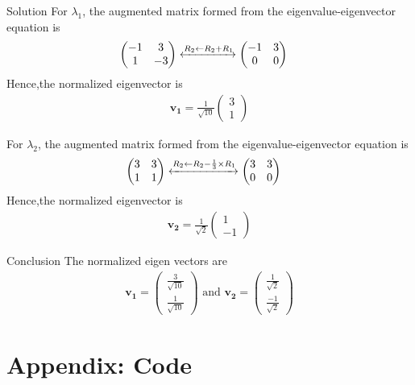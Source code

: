 \documentclass{beamer}
\numberwithin{equation}{section}
\theoremstyle{remark}
\newcommand{\myvec}[1]{\ensuremath{\begin{pmatrix}#1\end{pmatrix}}}
\let\vec\mathbf
\begin{document}
\begin{frame}{Solution}
For $\lambda_1$, the augmented matrix formed from the eigenvalue-eigenvector equation is 
\begin{align}
    \begin{pmatrix}
        -1 & 3\\
        1 & -3
    \end{pmatrix}  &\xleftrightarrow{R_2 \leftarrow R_2 + R_1} \begin{pmatrix}
        -1 & 3\\
        0 & 0
    \end{pmatrix}
\end{align}
Hence,the normalized eigenvector is
\begin{align}
    \vec{v_1}=\frac{1}{\sqrt{10}}\myvec{3\\1}
\end{align}

For $\lambda_2$, the augmented matrix formed from the eigenvalue-eigenvector equation is 
\begin{align}
    \begin{pmatrix}
        3 & 3\\
        1 & 1
    \end{pmatrix}  &\xleftrightarrow{R_2 \leftarrow R_2 - \frac{1}{3} \times R_1} \begin{pmatrix}
        3 & 3\\
        0 & 0
    \end{pmatrix}
\end{align}
Hence,the normalized eigenvector is
\begin{align}
    \vec{v_2}=\frac{1}{\sqrt{2}}\myvec{1\\-1}
\end{align}
\end{frame}

\begin{frame}{Conclusion}
The normalized eigen vectors are 
\begin{align}
    \vec{v_1}=\myvec{\frac{3}{\sqrt{10}}\\ \frac{1}{\sqrt{10}}} \text{ and }\vec{v_2}=\myvec{\frac{1}{\sqrt{2}}\\ \frac{-1}{\sqrt{2}}}
\end{align}
\end{frame}

\section*{Appendix: Code}
\end{document}
